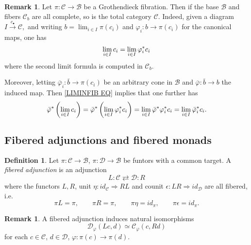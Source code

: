 \documentclass[a4paper,10pt
,draft
]{article}%
\numberwithin{equation}{section}
\numberwithin{figure}{section}
\theoremstyle{definition} %
\newtheorem{definition}[equation]{Definition}%
\newtheorem{remark}[equation]{Remark}%
\newcommand{\1}{\ensuremath{\mathbbm 1}}%
\begin{document}
\begin{remark}
Let $\pi \colon \mathcal{C} \to \mathcal{B}$ be a Grothendieck fibration.
Then if the base $\mathcal{B}$ and fibers 
$\mathcal{C}_b$
are all complete, so is the total category $\mathcal{C}$.
%
Indeed, given a diagram $I \xrightarrow{c_{\bullet}} \mathcal{C}$,\
and writing
$b = \lim_{i \in I} \pi(c_i)$
and 
$\varphi_i \colon b \to \pi(c_i)$
for the canonical maps,
one has
\begin{equation}\label{LIMINFIB EQ}
\lim_{i \in I} c_i = 
\lim_{i \in I} \varphi_{i}^{\**}c_i
\end{equation}
where the second limit formula is computed in $\mathcal{C}_b$.

Moreover, letting $\bar{\varphi}_i \colon \bar{b} \to \pi(c_i)$
be an arbitrary cone in $\mathcal{B}$
and $\bar{\varphi} \colon \bar{b} \to b$
the induced map.
Then \eqref{LIMINFIB EQ} implies that one further has
\begin{equation}\label{LIMINFIBSUP EQ}
\bar{\varphi}^{\**}\left(\lim_{i \in I} c_i\right) 
	= 
\bar{\varphi}^{\**}\left(\lim_{i \in I} \varphi_{i}^{\**}c_i\right)
	=
\lim_{i \in I} \bar{\varphi}^{\**} \varphi_{i}^{\**}c_i
	=
\lim_{i \in I} \bar{\varphi}_{i}^{\**}c_i.
\end{equation}
\end{remark}





\subsection{Fibered adjunctions and fibered monads}
\label{FIBCAT_SEC}



\begin{definition}\label{FIBADJ DEF}
Let 
$\pi \colon \mathcal{C} \to \mathcal{B}$,
$\pi \colon \mathcal{D} \to \mathcal{B}$
be funtors with a common target.
A \emph{fibered adjunction} is an adjunction
\[
L \colon \mathcal{C} \rightleftarrows \mathcal{D} \colon R
\]
where the functors $L,R$, 
unit $\eta \colon id_{\mathcal{C}} \Rightarrow RL$ and 
counit $\epsilon \colon LR \Rightarrow id_{\mathcal{D}}$
are all fibered, i.e.
\[
\pi L=\pi, \qquad
\pi R = \pi, \qquad
\pi \eta = id_{\pi}, \qquad 
\pi\epsilon = id_{\pi}.
\]
\end{definition}



\begin{remark}
A fibered adjunction induces natural isomorphisms
\[
\mathcal{D}_{\varphi}\left(Lc,d\right)
\simeq
\mathcal{C}_{\varphi}\left(c,Rd\right)
\]
for each $c\in \mathcal{C}$, $d \in \mathcal{D}$, 
$\varphi \colon \pi(c)\to \pi(d)$. 
\end{remark}
\end{document}
